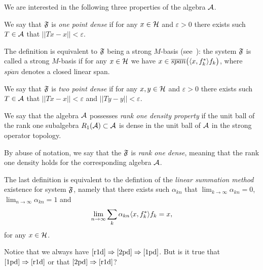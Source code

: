 \documentclass[12pt]{amsart}
\begin{document}
  We are interested in the following three properties of the algebra $\cal{A}$.
  \begin{definition}
    \label{1pd}
    We say that $\fsys$ is \emph{one point dense} if for any $x \in \cal{H}$ and $\varepsilon > 0$
      there exists such $T\in \cal{A}$ that $||Tx - x|| < \varepsilon$.

  \end{definition}
    The definition is equivalent to $\fsys$ being a strong $M$-basis (see~\cite{katavolos}):
    the system $\fsys$ is called a strong $M$-basis if for any $x\in\cal{H}$ we have $x \in \overline{span}\big(\inner{x}{f^*_k}f_k\big)$, where
      $\overline{span}$ denotes a closed linear span.
  \begin{definition}
    \label{2pd}
    We say that $\fsys$ is \emph{two point dense} if for any $x, y \in \cal{H}$ and $\varepsilon > 0$
      there exists such $T\in \cal{A}$ that $||Tx - x|| < \varepsilon$ and $||Ty - y|| < \varepsilon$.
  \end{definition}
  \begin{definition}
    \label{r1d}
    We say that the algebra $\cal{A}$ possesses \emph{rank one density property} if
      the unit ball of the rank one subalgebra $R_1(\cal{A}) \subset \cal{A}$ is dense in the unit ball of $\cal{A}$ in the strong operator topology.
  \end{definition}
  By abuse of notation, we say that the $\fsys$ is \emph{rank one dense}, meaning that the rank one density holds for the corresponding algebra $\cal{A}$.

    The last definition is equivalent to the defintion of the \emph{linear summation method} existence for system $\fsys$, namely that
      there exists such $\alpha_{kn}$ that $\lim_{k \to \infty} \alpha_{kn} = 0$, $\lim_{n \to \infty} \alpha_{kn} = 1$ and
      \[
        \lim_{n \to \infty} \sum_k \alpha_{kn} \inner{x}{f^*_k}f_k = x,
      \]
      for any $x \in \cal{H}$.

  Notice that we always have $\ref{r1d} \Rightarrow \ref{2pd} \Rightarrow \ref{1pd}$.
  But is it true that $\ref{1pd} \Rightarrow \ref{r1d}$ or that $\ref{2pd} \Rightarrow \ref{r1d}$?
\end{document}
